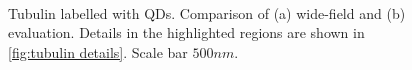 %
%
%
%

%

\begin{figure}[!htb]
	\newcommand{\wf}{.47\textwidth}
	\centering
	\\
	\caption{Tubulin labelled with QDs. Comparison of (a) wide-field and (b) \inmf{} evaluation. Details in the highlighted regions are shown in \autoref{fig:tubulin details}. Scale bar $500 \unit{nm}$.}
	\label{fig:tubulin WF and NMF}
\end{figure}


